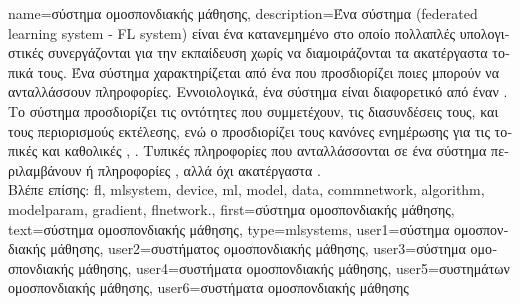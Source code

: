 {name={\foreignlanguage{greek}{σύστημα ομοσπονδιακής μάθησης}},
	description={\foreignlanguage{greek}{Ένα σύστημα}  
		(federated learning system - FL system) \foreignlanguage{greek}{είναι ένα κατανεμημένο}  \foreignlanguage{greek}{στο 
		οποίο πολλαπλές υπολογιστικές}  \foreignlanguage{greek}{συνεργάζονται για την 
		εκπαίδευση}   \foreignlanguage{greek}{χωρίς να διαμοιράζονται 
		τα ακατέργαστα τοπικά}  \foreignlanguage{greek}{τους. Ένα σύστημα}  
		\foreignlanguage{greek}{χαρακτηρίζεται από ένα}  \foreignlanguage{greek}{που προσδιορίζει ποιες}
		 \foreignlanguage{greek}{μπορούν να ανταλλάσσουν πληροφορίες. Εννοιολογικά, ένα 
		σύστημα}  \foreignlanguage{greek}{εί\-ναι διαφορετικό από έναν} 
		  \cite{DistributedSystems}. \foreignlanguage{greek}{Το σύστημα 
		προσδιορίζει τις οντότητες που συμμετέχουν, τις διασυνδέσεις τους, και τους περιορισμούς εκτέλεσης, 
		ενώ ο}  \foreignlanguage{greek}{προσδιορίζει τους κανόνες ενημέρωσης για τις τοπικές 
		και καθολικές}  \cite{LynchDistributedAlgorithms}, \cite{KnuthAlgoBook}.
		\foreignlanguage{greek}{Τυπικές πληροφορίες που ανταλλάσσονται σε ένα σύστημα}  
		\foreignlanguage{greek}{περιλαμβάνουν}  \foreignlanguage{greek}{ή πληροφορίες} 
		, \foreignlanguage{greek}{αλλά όχι ακατέργαστα} .
		\\
		\foreignlanguage{greek}{Βλέπε επίσης:} \gls{fl}, \gls{mlsystem}, \gls{device}, \gls{ml}, \gls{model}, \gls{data}, 
		\gls{commnetwork}, \gls{algorithm}, \gls{modelparam}, \gls{gradient}, \gls{flnetwork}.},
 	first={\foreignlanguage{greek}{σύστημα ομοσπονδιακής μάθησης}},
 	text={\foreignlanguage{greek}{σύστημα ομοσπονδιακής μάθησης}},
 	type=mlsystems,
	user1={\foreignlanguage{greek}{σύστημα ομοσπονδιακής μάθησης}}, %
	user2={\foreignlanguage{greek}{συστήματος ομοσπονδιακής μάθησης}}, %
	user3={\foreignlanguage{greek}{σύστημα ομοσπονδιακής μάθησης}}, %
	user4={\foreignlanguage{greek}{συστήματα ομοσπονδιακής μάθησης}}, %
	user5={\foreignlanguage{greek}{συστημάτων ομοσπονδιακής μάθησης}}, %
	user6={\foreignlanguage{greek}{συστήματα ομοσπονδιακής μάθησης}} %
}

